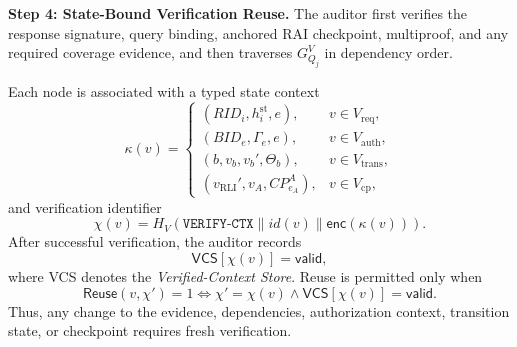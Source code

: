 \documentclass[lettersize,journal]{IEEEtran}
\begin{document}
\medskip
\noindent\textbf{Step 4: State-Bound Verification Reuse.}
The auditor first verifies the response signature, query binding,
anchored RAI checkpoint, multiproof, and any required coverage
evidence, and then traverses $G_{Q_j}^{V}$ in dependency order.

Each node is associated with a typed state context
\begin{equation}
\kappa(v)=
\begin{cases}
(RID_i,h_i^{\mathrm{st}},e),
&v\in V_{\mathrm{req}},\\
(BID_e,\Gamma_e,e),
&v\in V_{\mathrm{auth}},\\
(b,v_b,v_b',\Theta_b),
&v\in V_{\mathrm{trans}},\\
(v_{\mathrm{RLI}}',v_A,CP_{e_A}^A),
&v\in V_{\mathrm{cp}},
\end{cases}
\end{equation}
and verification identifier
\begin{equation}
\chi(v)=
H_V(
\texttt{VERIFY-CTX}\parallel
id(v)\parallel\mathsf{enc}(\kappa(v))).
\end{equation}
After successful verification, the auditor records
\begin{equation}
\mathsf{VCS}[\chi(v)]=\mathsf{valid},
\end{equation}
where VCS denotes the \emph{Verified-Context Store}. Reuse is permitted
only when
\begin{equation}
\mathsf{Reuse}(v,\chi')
=1
\Longleftrightarrow
\chi'=\chi(v)
\land
\mathsf{VCS}[\chi(v)]=\mathsf{valid}.
\label{eq:saver_reuse}
\end{equation}
Thus, any change to the evidence, dependencies, authorization context,
transition state, or checkpoint requires fresh verification.
\end{document}
